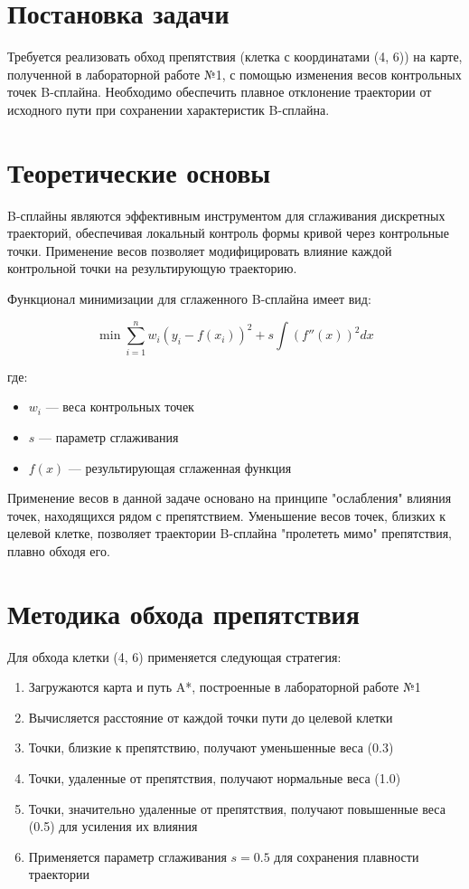 \section{Постановка задачи}

Требуется реализовать обход препятствия (клетка с координатами (4, 6)) на карте, полученной в лабораторной работе №1, с помощью изменения весов контрольных точек B-сплайна. Необходимо обеспечить плавное отклонение траектории от исходного пути при сохранении характеристик B-сплайна.

\section{Теоретические основы}

B-сплайны являются эффективным инструментом для сглаживания дискретных траекторий, обеспечивая локальный контроль формы кривой через контрольные точки. Применение весов позволяет модифицировать влияние каждой контрольной точки на результирующую траекторию.

Функционал минимизации для сглаженного B-сплайна имеет вид:

$$\min \sum_{i=1}^{n} w_i (y_i - f(x_i))^2 + s \int (f''(x))^2 dx$$

где:
\begin{itemize}
\item $w_i$ --- веса контрольных точек
\item $s$ --- параметр сглаживания
\item $f(x)$ --- результирующая сглаженная функция
\end{itemize}

Применение весов в данной задаче основано на принципе "ослабления" влияния точек, находящихся рядом с препятствием. Уменьшение весов точек, близких к целевой клетке, позволяет траектории B-сплайна "пролететь мимо" препятствия, плавно обходя его.

\section{Методика обхода препятствия}

Для обхода клетки (4, 6) применяется следующая стратегия:
\begin{enumerate}
\item Загружаются карта и путь A*, построенные в лабораторной работе №1
\item Вычисляется расстояние от каждой точки пути до целевой клетки
\item Точки, близкие к препятствию, получают уменьшенные веса (0.3)
\item Точки, удаленные от препятствия, получают нормальные веса (1.0)
\item Точки, значительно удаленные от препятствия, получают повышенные веса (0.5) для усиления их влияния
\item Применяется параметр сглаживания $s = 0.5$ для сохранения плавности траектории
\end{enumerate}

